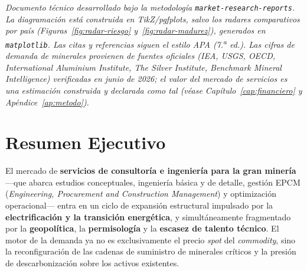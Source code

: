 \documentclass[11pt,letterpaper]{report}
\begin{document}
\begin{titlepage}
\vfill
{\footnotesize\color{darkgray}\textit{Documento técnico desarrollado bajo la metodología \texttt{market-research-reports}. La diagramación
está construida en TikZ/pgfplots, salvo los radares comparativos por país (Figuras~\ref{fig:radar-riesgo} y~\ref{fig:radar-madurez}),
generados en \texttt{matplotlib}. Las citas y referencias siguen el estilo APA (7.\textsuperscript{a} ed.). Las cifras de demanda de
minerales provienen de fuentes oficiales (IEA, USGS, OECD, International Aluminium Institute, The Silver Institute, Benchmark Mineral
Intelligence) verificadas en junio de 2026; el valor del mercado de servicios es una estimación construida y declarada como tal
(véase Capítulo~\ref{cap:financiero} y Apéndice~\ref{ap:metodo}).}\par}
\end{titlepage}

\setcounter{page}{2}
{\hypersetup{linkcolor=black}
\tableofcontents
\clearpage
\listoffigures
\vspace{1.2cm}
\listoftables}
\clearpage
{}
\setcounter{page}{1}

\chapter{Resumen Ejecutivo}
El mercado de \textbf{servicios de consultoría e ingeniería para la gran minería} ---que abarca estudios conceptuales,
ingeniería básica y de detalle, gestión EPCM (\emph{Engineering, Procurement and Construction Management}) y optimización
operacional--- entra en un ciclo de expansión estructural impulsado por la \textbf{electrificación y la transición energética},
y simultáneamente fragmentado por la \textbf{geopolítica}, la \textbf{permisología} y la \textbf{escasez de talento técnico}.
El motor de la demanda ya no es exclusivamente el precio \emph{spot} del \emph{commodity}, sino la reconfiguración de las
cadenas de suministro de minerales críticos y la presión de descarbonización sobre los activos existentes.
\end{document}
